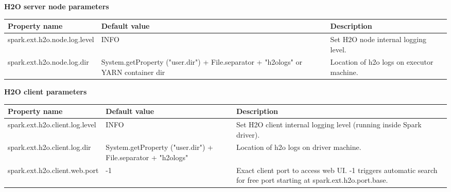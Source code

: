 \pagebreak
\textbf{H2O server node parameters}
\begin{table}[!ht]
\centering
{\small
\begin{tabular}{l p{3.0cm} p{3.0cm}}
\toprule
Property name & Default value  & Description \\
\midrule
		
spark.ext.h2o.node.log.level & INFO & Set H2O node internal logging level.\\  \addlinespace

spark.ext.h2o.node.log.dir  & System.getProperty ("user.dir") + File.separator + "h2ologs" or YARN container dir &	Location of h2o logs on executor machine.\\

\bottomrule
\end{tabular} 
} %
\end{table}

\textbf{H2O client parameters}
\begin{table}[!ht]
\centering
{\small
\begin{tabular}{l p{3.0cm} p{3.0cm}}
\toprule
Property name & Default value  & Description \\
\midrule

spark.ext.h2o.client.log.level & INFO & Set H2O client internal logging level (running inside Spark driver).\\  \addlinespace

spark.ext.h2o.client.log.dir & System.getProperty ("user.dir") + File.separator + "h2ologs" & Location of h2o logs on driver machine.\\  \addlinespace

spark.ext.h2o.client.web.port & -1 & Exact client port to access web UI. -1 triggers automatic search for free port starting at spark.ext.h2o.port.base.\\  
\bottomrule
\end{tabular} 
} %
\end{table}
